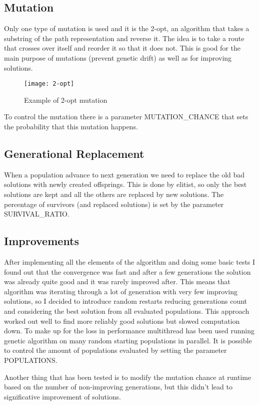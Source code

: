 	\subsection{Mutation}
		Only one type of mutation is used and it is the 2-opt, an algorithm that takes a substring of the path representation and reverse it. The idea is to take a route that crosses over itself and reorder it so that it does not.
		This is good for the main purpose of mutations (prevent genetic drift) as well as for improving solutions.
		
		\begin{figure}[h]
		\texttt{[image: 2-opt]}
		\centering
		\caption{Example of 2-opt mutation}
		\end{figure}
		
		To control the mutation there is a parameter MUTATION\_CHANCE that sets the probability that this mutation happens.
		
	\subsection{Generational Replacement}
		When a population advance to next generation we need to replace the old bad solutions with newly created offsprings. This is done by elitist, so only the best solutions are kept and all the others are replaced by new solutions. The percentage of survivors (and replaced solutions) is set by the parameter SURVIVAL\_RATIO.
		
	\subsection{Improvements}
		After implementing all the elements of the algorithm and doing some basic tests I found out that the convergence was fast and after a few generations the solution was already quite good and it was rarely improved after. This means that algorithm was iterating through a lot of generation with very few improving solutions, so I decided to introduce random restarts reducing generations count and considering the best solution from all evaluated populations. This approach worked out well to find more reliably good solutions but slowed computation down. To make up for the loss in performance multithread has been used running genetic algorithm on many random starting populations in parallel. It is possible to control the amount of populations evaluated by setting the parameter POPULATIONS.
		
		Another thing that has been tested is to modify the mutation chance at runtime based on the number of non-improving generations, but this didn't lead to significative improvement of solutions.
		
		